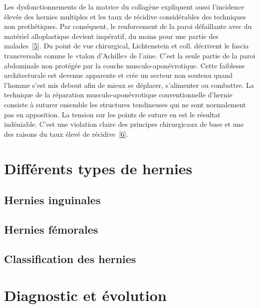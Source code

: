 \documentclass[frenc,10pt,a4paper]{article}
\begin{document}
Les dysfonctionnements de la matrice du collagène expliquent aussi
l'incidence élevée des hernies multiples et les taux de récidive
considérables des techniques non prothétiques. Par conséquent, le
renforcement de la paroi défaillante avec du matériel alloplastique
devient impératif, du moins pour une partie des
malades~\hyperref[csl:5]{[5]}. Du point de vue chirurgical, Lichtenstein et
coll. décrivent le fascia transversalis comme le «talon d'Achille» de
l'aine. C'est la seule partie de la paroi abdominale non protégée par la
couche musculo-aponévrotique. Cette faiblesse architecturale est devenue
apparente et crée un secteur non soutenu quand l'homme s'est mis debout
afin de mieux se déplacer, s'alimenter ou combattre. La technique de la
réparation musculo-aponévrotique conventionnelle d'hernie consiste à
suturer ensemble les structures tendineuses qui ne sont normalement pas
en apposition. La tension sur les points de suture en est le résultat
indéniable. C'est une violation claire des principes chirurgicaux de
base et une des raisons du taux élevé de récidive~\hyperref[csl:6]{[6]}.

\par\null

\section{Différents types de
hernies}

{\label{713964}}\par\null

\subsection{Hernies inguinales}

{\label{546321}}

\subsection{Hernies fémorales}

{\label{882715}}

\subsection{Classification des
hernies}

{\label{875124}}

\section{Diagnostic et évolution}
\end{document}
